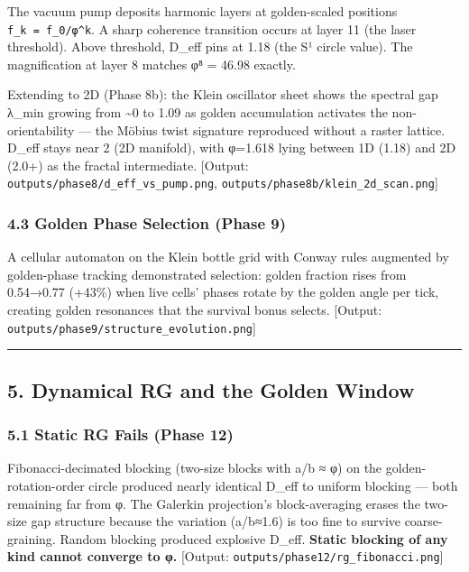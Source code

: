 \documentclass[
]{article}
\begin{document}
The vacuum pump deposits harmonic layers at golden-scaled positions
\texttt{f\_k\ =\ f\_0/φ\^{}k}. A sharp coherence transition occurs at
layer 11 (the laser threshold). Above threshold, D\_eff pins at 1.18
(the S¹ circle value). The magnification at layer 8 matches φ⁸ = 46.98
exactly.

Extending to 2D (Phase 8b): the Klein oscillator sheet shows the
spectral gap λ\_min growing from \textasciitilde0 to 1.09 as golden
accumulation activates the non-orientability --- the Möbius twist
signature reproduced without a raster lattice. D\_eff stays near 2 (2D
manifold), with φ=1.618 lying between 1D (1.18) and 2D (2.0+) as the
fractal intermediate. {[}Output:
\texttt{outputs/phase8/d\_eff\_vs\_pump.png},
\texttt{outputs/phase8b/klein\_2d\_scan.png}{]}

\subsubsection{4.3 Golden Phase Selection (Phase
9)}\label{golden-phase-selection-phase-9}

A cellular automaton on the Klein bottle grid with Conway rules
augmented by golden-phase tracking demonstrated selection: golden
fraction rises from 0.54→0.77 (+43\%) when live cells' phases rotate by
the golden angle per tick, creating golden resonances that the survival
bonus selects. {[}Output:
\texttt{outputs/phase9/structure\_evolution.png}{]}

\begin{center}\rule{0.5\linewidth}{0.5pt}\end{center}

\subsection{5. Dynamical RG and the Golden
Window}\label{dynamical-rg-and-the-golden-window}

\subsubsection{5.1 Static RG Fails (Phase
12)}\label{static-rg-fails-phase-12}

Fibonacci-decimated blocking (two-size blocks with a/b ≈ φ) on the
golden-rotation-order circle produced nearly identical D\_eff to uniform
blocking --- both remaining far from φ. The Galerkin projection's
block-averaging erases the two-size gap structure because the variation
(a/b≈1.6) is too fine to survive coarse-graining. Random blocking
produced explosive D\_eff. \textbf{Static blocking of any kind cannot
converge to φ.} {[}Output: \texttt{outputs/phase12/rg\_fibonacci.png}{]}
\end{document}

